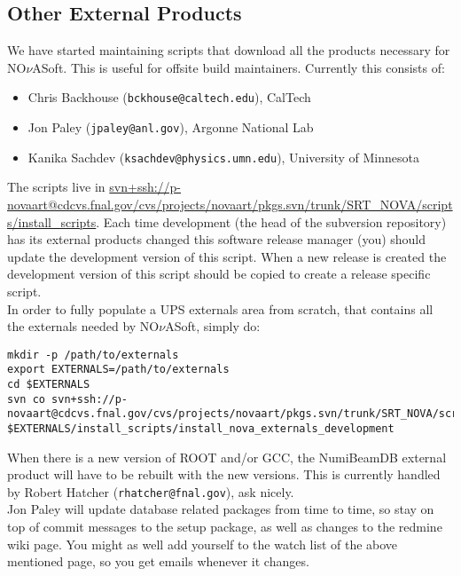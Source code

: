 \documentclass[letterpaper,10pt]{article}
\newcommand{\nova}{NO$\nu$A}
\begin{document}
\subsection{Other External Products}

We have started maintaining scripts that download all the products necessary for \nova Soft. This is useful for offsite build maintainers. Currently this consists of:

\begin{itemize}
\item Chris Backhouse (\verb|bckhouse@caltech.edu|), CalTech
\item Jon Paley (\verb|jpaley@anl.gov|), Argonne National Lab
\item Kanika Sachdev (\verb|ksachdev@physics.umn.edu|), University of Minnesota
\end{itemize}

\noindent
The scripts live in \url{svn+ssh://p-novaart@cdcvs.fnal.gov/cvs/projects/novaart/pkgs.svn/trunk/SRT_NOVA/scripts/install_scripts}. Each time development (the head of the subversion repository) has its external products changed this software release manager (you) should update the development version of this script. When a new release is created the development version of this script should be copied to create a release specific script.\\

\noindent
In order to fully populate a UPS externals area from scratch, that contains all the externals needed by \nova Soft, simply do:

\begin{verbatim}
mkdir -p /path/to/externals
export EXTERNALS=/path/to/externals
cd $EXTERNALS
svn co svn+ssh://p-novaart@cdcvs.fnal.gov/cvs/projects/novaart/pkgs.svn/trunk/SRT_NOVA/scripts/install_scripts
$EXTERNALS/install_scripts/install_nova_externals_development 
\end{verbatim}


\noindent
When there is a new version of ROOT and/or GCC, the NumiBeamDB external product will have to be rebuilt with the new versions. This is currently handled by Robert Hatcher (\verb|rhatcher@fnal.gov|), ask nicely.\\

\noindent
Jon Paley will update database related packages from time to time, so stay on top of commit messages to the setup package, as well as changes to the redmine wiki page. You might as well add yourself to the watch list of the above mentioned page, so you get emails whenever it changes.
\end{document}
